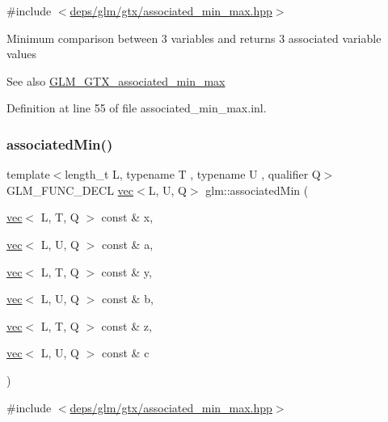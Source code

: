 {\ttfamily \#include $<$\hyperlink{associated__min__max_8hpp}{deps/glm/gtx/associated\+\_\+min\+\_\+max.\+hpp}$>$}

Minimum comparison between 3 variables and returns 3 associated variable values \begin{DoxySeeAlso}{See also}
\hyperlink{group__gtx__associated__min__max}{G\+L\+M\+\_\+\+G\+T\+X\+\_\+associated\+\_\+min\+\_\+max} 
\end{DoxySeeAlso}


Definition at line 55 of file associated\+\_\+min\+\_\+max.\+inl.

\mbox{\label{group__gtx__associated__min__max_ga723e5411cebc7ffbd5c81ffeec61127d}} 
\subsubsection{\texorpdfstring{associated\+Min()}{associatedMin()}\hspace{0.1cm}{\footnotesize\ttfamily [6/10]}}
{\footnotesize\ttfamily template$<$length\+\_\+t L, typename T , typename U , qualifier Q$>$ \\
G\+L\+M\+\_\+\+F\+U\+N\+C\+\_\+\+D\+E\+CL \hyperlink{structglm_1_1vec}{vec}$<$L, U, Q$>$ glm\+::associated\+Min (\begin{DoxyParamCaption}\item[{\hyperlink{structglm_1_1vec}{vec}$<$ L, T, Q $>$ const \&}]{x,  }\item[{\hyperlink{structglm_1_1vec}{vec}$<$ L, U, Q $>$ const \&}]{a,  }\item[{\hyperlink{structglm_1_1vec}{vec}$<$ L, T, Q $>$ const \&}]{y,  }\item[{\hyperlink{structglm_1_1vec}{vec}$<$ L, U, Q $>$ const \&}]{b,  }\item[{\hyperlink{structglm_1_1vec}{vec}$<$ L, T, Q $>$ const \&}]{z,  }\item[{\hyperlink{structglm_1_1vec}{vec}$<$ L, U, Q $>$ const \&}]{c }\end{DoxyParamCaption})}



{\ttfamily \#include $<$\hyperlink{associated__min__max_8hpp}{deps/glm/gtx/associated\+\_\+min\+\_\+max.\+hpp}$>$}

